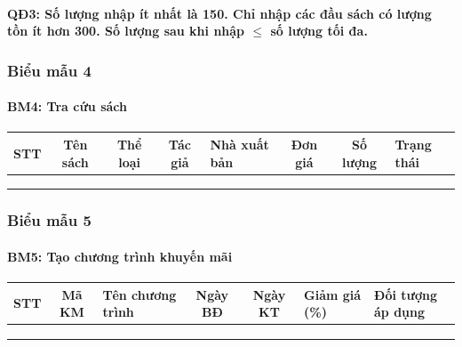 \documentclass[12pt]{report}
\begin{document}
                \paragraph{QĐ3: Số lượng nhập ít nhất là \textbf{150}. Chỉ nhập các đầu sách có lượng tồn ít hơn \textbf{300}. Số lượng sau khi nhập $\le$ số lượng tối đa.}
            \subsubsection{Biểu mẫu 4}
                \paragraph{BM4: Tra cứu sách}
                \begin{tabularx}{\textwidth}{|c|c|c|c|>{\RaggedRight}X|c|c|>{\RaggedRight}X|}
                    \hline
                    \textbf{STT} & \textbf{Tên sách} & 
                    \textbf{Thể loại} & \textbf{Tác giả} & \textbf{Nhà xuất bản} & 
                    \textbf{Đơn giá} & \textbf{Số lượng} & \textbf{Trạng thái} \\ \hline
                     & & & & & & & \\ \hline
                     & & & & & & & \\ \hline
                     & & & & & & & \\ \hline
                \end{tabularx}
            \subsubsection{Biểu mẫu 5}
                \paragraph{BM5: Tạo chương trình khuyến mãi}
                \begin{tabularx}{\textwidth}{|c|c|>{\RaggedRight}X|c|c|>{\RaggedRight}X|>{\RaggedRight}X|}
                    \hline
                    \textbf{STT} & \textbf{Mã KM} & \textbf{Tên chương trình} & \textbf{Ngày BĐ} & \textbf{Ngày KT} & \textbf{Giảm giá (\%)} & \textbf{Đối tượng áp dụng} \\ \hline
                     & & & & & & \\ \hline
                     & & & & & & \\ \hline
                     & & & & & & \\ \hline
                \end{tabularx}
\end{document}
